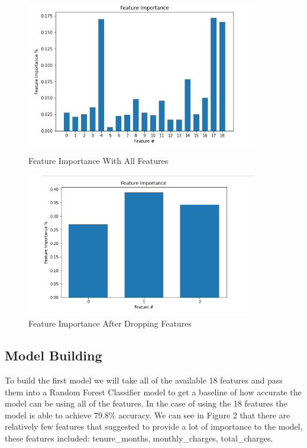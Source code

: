 \documentclass[12pt, a4paper]{article}
\begin{document}
\begin{figure}
    \centering
    \begin{minipage}{0.45\textwidth}
        \centering
        \includegraphics[width=0.9\textwidth]{photos/feautreImportanceBeforeDrop.JPG}
        \caption{Feature Importance With All Features}
    \end{minipage}\hfill
    \begin{minipage}{0.45\textwidth}
        \centering
        \includegraphics[width=0.9\textwidth]{photos/feauresAfterDrop.png}
        \caption{Feature Importance After Dropping Features}
    \end{minipage}
\end{figure}
\subsection{Model Building}

To build the first model we will take all of the available 18 features and pass them into a Random Forest Classifier model to get a baseline of how accurate the model can be using all of the features. In the case of using the 18 features the model is able to achieve 79.8\% accuracy. We can see in Figure 2 that there are relatively few features that suggested to provide a lot of importance to the model, these features included: tenure\_months, monthly\_charges, total\_charges.
\end{document}
